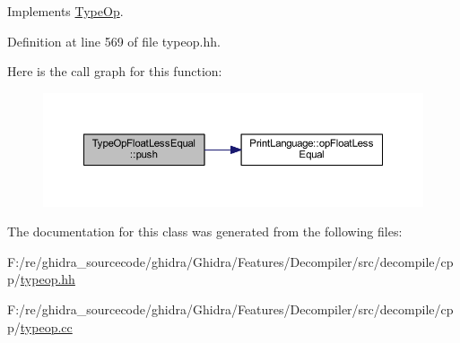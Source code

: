 Implements \mbox{\hyperlink{class_type_op_ac9c9544203ed74dabe6ac662b653b2af}{Type\+Op}}.



Definition at line 569 of file typeop.\+hh.

Here is the call graph for this function\+:
\nopagebreak
\begin{figure}[H]
\begin{center}
\leavevmode
\includegraphics[width=350pt]{class_type_op_float_less_equal_a9af8f29788c448390fb9ee38a3060562_cgraph}
\end{center}
\end{figure}


The documentation for this class was generated from the following files\+:\begin{DoxyCompactItemize}
\item 
F\+:/re/ghidra\+\_\+sourcecode/ghidra/\+Ghidra/\+Features/\+Decompiler/src/decompile/cpp/\mbox{\hyperlink{typeop_8hh}{typeop.\+hh}}\item 
F\+:/re/ghidra\+\_\+sourcecode/ghidra/\+Ghidra/\+Features/\+Decompiler/src/decompile/cpp/\mbox{\hyperlink{typeop_8cc}{typeop.\+cc}}\end{DoxyCompactItemize}
